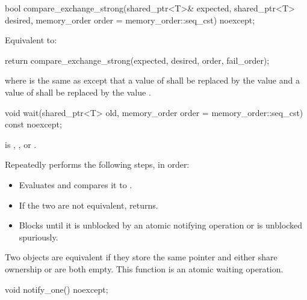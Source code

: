 %
\begin{itemdecl}
bool compare_exchange_strong(shared_ptr<T>& expected, shared_ptr<T> desired,
                             memory_order order = memory_order::seq_cst) noexcept;
\end{itemdecl}

\begin{itemdescr}
\pnum
\effects
Equivalent to:
\begin{codeblock}
return compare_exchange_strong(expected, desired, order, fail_order);
\end{codeblock}
where  is the same as 
except that a value of 
shall be replaced by the value  and
a value of 
shall be replaced by the value .
\end{itemdescr}

%
\begin{itemdecl}
void wait(shared_ptr<T> old, memory_order order = memory_order::seq_cst) const noexcept;
\end{itemdecl}

\begin{itemdescr}
\pnum
\expects
{} is
,
, or
.

\pnum
\effects
Repeatedly performs the following steps, in order:
\begin{itemize}
\item
  Evaluates  and compares it to .
\item
  If the two are not equivalent, returns.
\item
  Blocks until it
  is unblocked by an atomic notifying operation or is unblocked spuriously.
\end{itemize}

\pnum
\remarks
Two  objects are equivalent
if they store the same pointer and either share ownership or are both empty.
This function is an atomic waiting operation.
\end{itemdescr}

%
\begin{itemdecl}
void notify_one() noexcept;
\end{itemdecl}

